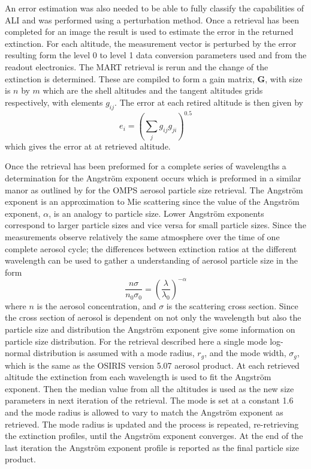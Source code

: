 \documentclass[12pt]{article}
\begin{document}
An error estimation was also needed to be able to fully classify the capabilities of ALI and was performed using a perturbation method. Once a retrieval has been completed for an image the result is used to estimate the error in the returned extinction. For each altitude, the measurement vector is perturbed by the error resulting form the level 0 to level 1 data conversion parameters used and from the readout electronics. The MART retrieval is rerun and the change of the extinction is determined. These are compiled to form a gain matrix, $\mathbf{G}$, with size is $n$ by $m$ which are the shell altitudes and the tangent altitudes grids respectively, with elements $g_{ij}$. The error at each retired altitude is then given by
\begin{equation}
    e_{i} = \left(\sum_{j}g_{ij}g_{ji}\right)^{0.5}
\end{equation}
which gives the error at at retrieved altitude.

Once the retrieval has been preformed for a complete series of wavelengths a determination for the Angstr\"{o}m exponent occurs which is preformed in a similar manor as outlined by \cite{Rault2013} for the OMPS aerosol particle size retrieval. The Angstr\"{o}m exponent is an approximation to Mie scattering since the value of the Angstr\"{o}m exponent, $\alpha$, is an analogy to particle size. Lower Angstr\"{o}m exponents correspond to larger particle sizes and vice versa for small particle sizes. Since the measurements observe relatively the same atmosphere over the time of one complete aerosol cycle; the differences between extinction ratios at the different wavelength can be used to gather a understanding of aerosol particle size in the form
\begin{equation}
    \frac{n\sigma}{n_{0}\sigma_{0}} = \left(\frac{\lambda}{\lambda_{0}}\right)^{-\alpha}
    \label{eqn:agstromCoefficient}
\end{equation}
where $n$ is the aerosol concentration, and $\sigma$ is the scattering cross section. Since the cross section of aerosol is dependent on not only the wavelength but also the particle size and distribution the Angstr\"{o}m exponent give some information on particle size distribution. For the retrieval described here a single mode log-normal distribution is assumed with a mode radius, $r_{g}$, and the mode width, $\sigma_{g}$, which is the same as the OSIRIS version 5.07 aerosol product. At each retrieved altitude the extinction from each wavelength is used to fit the Angstr\"{o}m exponent. Then the median value from all the altitudes is used as the new size parameters in next iteration of the retrieval. The mode is set at a constant 1.6 and the mode radius is allowed to vary to match the Angstr\"{o}m exponent as retrieved. The mode radius is updated and the process is repeated, re-retrieving the extinction profiles, until the Angstr\"{o}m exponent converges. At the end of the last iteration the Angstr\"{o}m exponent profile is reported as the final particle size product.
\end{document}
